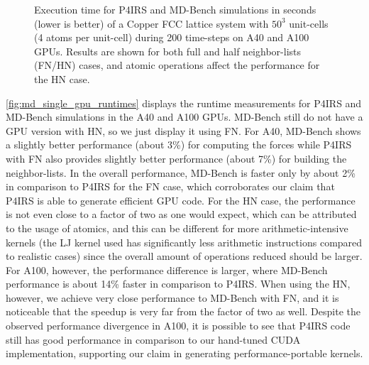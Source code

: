 \documentclass[Afour,sageh,times]{sagej}
\begin{document}
\begin{figure}[t]
\vspace{-1ex}
	\caption{Execution time for P4IRS and MD-Bench simulations in seconds (lower is better) of a Copper FCC lattice system with $50^{3}$ unit-cells (4 atoms per unit-cell) during 200 time-steps on A40 and A100 GPUs. Results are shown for both full and half neighbor-lists (FN/HN) cases, and atomic operations affect the performance for the HN case.}
\vspace{-2ex}
\centering
\label{fig:md_single_gpu_runtimes}
\end{figure}

\autoref{fig:md_single_gpu_runtimes} displays the runtime measurements for P4IRS and MD-Bench simulations in the A40 and A100 GPUs.
MD-Bench still do not have a GPU version with \ac{HN}, so we just display it using \ac{FN}.
For A40, MD-Bench shows a slightly better performance (about 3\%) for computing the forces while P4IRS with \ac{FN} also provides slightly better performance (about 7\%) for building the neighbor-lists.
In the overall performance, MD-Bench is faster only by about 2\% in comparison to P4IRS for the \ac{FN} case, which corroborates our claim that P4IRS is able to generate efficient GPU code.
For the \ac{HN} case, the performance is not even close to a factor of two as one would expect, which can be attributed to the usage of atomics, and this can be different for more arithmetic-intensive kernels (the \ac{LJ} kernel used has significantly less arithmetic instructions compared to realistic cases) since the overall amount of operations reduced should be larger.
For A100, however, the performance difference is larger, where MD-Bench performance is about 14\% faster in comparison to P4IRS.
When using the \ac{HN}, however, we achieve very close performance to MD-Bench with \ac{FN}, and it is noticeable that the speedup is very far from the factor of two as well.
Despite the observed performance divergence in A100, it is possible to see that P4IRS code still has good performance in comparison to our hand-tuned CUDA implementation, supporting our claim in generating performance-portable kernels.
\end{document}
